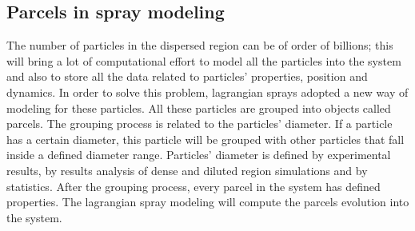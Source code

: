     \subsection{Parcels in spray modeling}
    The number of particles in the dispersed region can be of order of billions; this will bring a lot of computational effort to model all the particles into the system and also to store all the data related to particles' properties, position and dynamics. In order to solve this problem, lagrangian sprays adopted a new way of modeling for these particles.
    All these particles are grouped into objects called parcels. The grouping process is related to the particles' diameter. If a particle has a certain diameter, this particle will be grouped with other particles that fall inside a defined diameter range. Particles' diameter is defined by experimental results, by results analysis of dense and diluted region simulations and by statistics. After the grouping process, every parcel in the system has defined properties. The lagrangian spray modeling will compute the parcels evolution into the system. 
    
